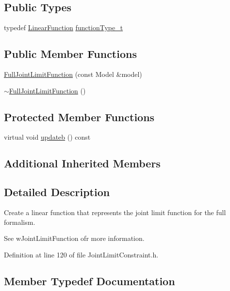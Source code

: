 \subsection*{Public Types}
\begin{DoxyCompactItemize}
\item 
typedef \hyperlink{classocra_1_1LinearFunction}{Linear\+Function} \hyperlink{classocra_1_1FullJointLimitFunction_a3ae743a316981d67933248a9d58f58fb}{function\+Type\+\_\+t}
\end{DoxyCompactItemize}
\subsection*{Public Member Functions}
\begin{DoxyCompactItemize}
\item 
\hyperlink{classocra_1_1FullJointLimitFunction_af49c77d067fe584cf6d3884eb33b2ed0}{Full\+Joint\+Limit\+Function} (const Model \&model)
\item 
\hyperlink{classocra_1_1FullJointLimitFunction_a84cc9b5e7efdf78fe9a279ef5940871b}{$\sim$\+Full\+Joint\+Limit\+Function} ()
\end{DoxyCompactItemize}
\subsection*{Protected Member Functions}
\begin{DoxyCompactItemize}
\item 
virtual void \hyperlink{classocra_1_1FullJointLimitFunction_a3c9bcab2026535cc5f2c0176552d449d}{updateb} () const
\end{DoxyCompactItemize}
\subsection*{Additional Inherited Members}


\subsection{Detailed Description}
Create a linear function that represents the joint limit function for the full formalism. 

See w\+Joint\+Limit\+Function ofr more information. 

Definition at line 120 of file Joint\+Limit\+Constraint.\+h.



\subsection{Member Typedef Documentation}
\hypertarget{classocra_1_1FullJointLimitFunction_a3ae743a316981d67933248a9d58f58fb}{}\label{classocra_1_1FullJointLimitFunction_a3ae743a316981d67933248a9d58f58fb} 
